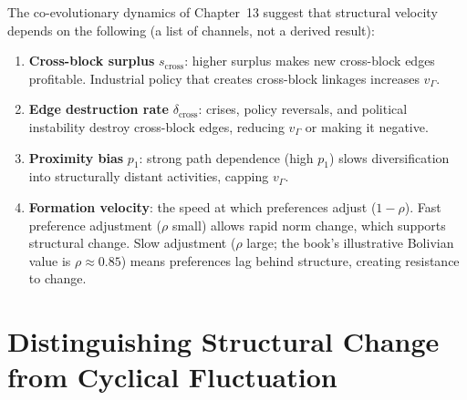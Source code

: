 \documentclass[../structural_economics_book.tex]{subfiles}
\begin{document}
\begin{remark}\label{ch23:prop:velocity_determinants}
The co-evolutionary dynamics of Chapter~13 suggest that structural velocity depends on the following (a list of channels, not a derived result):
\begin{enumerate}
\item \textbf{Cross-block surplus} $s_{\text{cross}}$: higher surplus makes new cross-block edges profitable. Industrial policy that creates cross-block linkages increases $v_\Gamma$.
\item \textbf{Edge destruction rate} $\delta_{\text{cross}}$: crises, policy reversals, and political instability destroy cross-block edges, reducing $v_\Gamma$ or making it negative.
\item \textbf{Proximity bias} $p_1$: strong path dependence (high $p_1$) slows diversification into structurally distant activities, capping $v_\Gamma$.
\item \textbf{Formation velocity}: the speed at which preferences adjust ($1 - \rho$). Fast preference adjustment ($\rho$ small) allows rapid norm change, which supports structural change. Slow adjustment ($\rho$ large; the book's illustrative Bolivian value is $\rho \approx 0.85$) means preferences lag behind structure, creating resistance to change.
\end{enumerate}
\end{remark}


\section{Distinguishing Structural Change from Cyclical Fluctuation}
\label{ch23:sec:distinguish}
\end{document}
